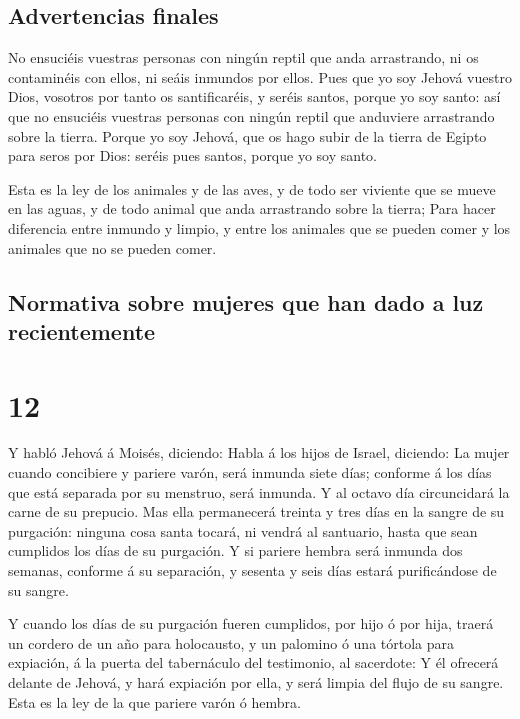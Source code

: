 \hypertarget{advertencias-finales}{%
\subsection{Advertencias finales}\label{advertencias-finales}}

 No ensuciéis vuestras personas con ningún reptil que
anda arrastrando, ni os contaminéis con ellos, ni seáis inmundos por
ellos.  Pues que yo soy Jehová vuestro Dios, vosotros por
tanto os santificaréis, y seréis santos, porque yo soy santo: así que no
ensuciéis vuestras personas con ningún reptil que anduviere arrastrando
sobre la tierra.  Porque yo soy Jehová, que os hago subir
de la tierra de Egipto para seros por Dios: seréis pues santos, porque
yo soy santo.

 Esta es la ley de los animales y de las aves, y de todo
ser viviente que se mueve en las aguas, y de todo animal que anda
arrastrando sobre la tierra;  Para hacer diferencia entre
inmundo y limpio, y entre los animales que se pueden comer y los
animales que no se pueden comer.

\hypertarget{normativa-sobre-mujeres-que-han-dado-a-luz-recientemente}{%
\subsection{Normativa sobre mujeres que han dado a luz
recientemente}\label{normativa-sobre-mujeres-que-han-dado-a-luz-recientemente}}

\hypertarget{section-03-12}{%
\section{12}\label{section-03-12}}

 Y habló Jehová á Moisés, diciendo:  Habla á
los hijos de Israel, diciendo: La mujer cuando concibiere y pariere
varón, será inmunda siete días; conforme á los días que está separada
por su menstruo, será inmunda.  Y al octavo día
circuncidará la carne de su prepucio.  Mas ella
permanecerá treinta y tres días en la sangre de su purgación: ninguna
cosa santa tocará, ni vendrá al santuario, hasta que sean cumplidos los
días de su purgación.  Y si pariere hembra será inmunda
dos semanas, conforme á su separación, y sesenta y seis días estará
purificándose de su sangre.

 Y cuando los días de su purgación fueren cumplidos, por
hijo ó por hija, traerá un cordero de un año para holocausto, y un
palomino ó una tórtola para expiación, á la puerta del tabernáculo del
testimonio, al sacerdote:  Y él ofrecerá delante de
Jehová, y hará expiación por ella, y será limpia del flujo de su sangre.
Esta es la ley de la que pariere varón ó hembra.

